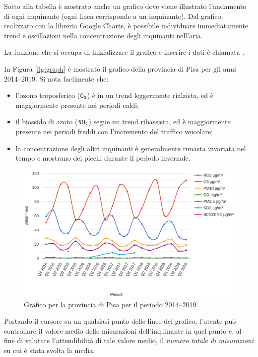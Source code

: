 Sotto alla tabella è mostrato anche un grafico dove viene illustrato l'andamento
di ogni inquinante (ogni linea corrisponde a un inquinante). Dal grafico,
realizzato con la libreria Google Charts, è possibile individuare immediatamente
trend e oscillazioni nella concentrazione degli inquinanti nell'aria.

La funzione che si occupa di inizializzare il grafico e inserire i dati è
chiamata .

In Figura \vref{fig:graph} è mostrato il grafico della provincia di Pisa per gli
anni 2014--2019. Si nota facilmente che:
\begin{itemize}
	\item l'ozono troposferico (\(\mathtt{O_3}\)) è in un trend leggermente
		rialzista, ed è maggiormente presente nei periodi caldi;
	\item il biossido di azoto (\(\mathtt{NO_2}\)) segue un trend ribassista,
		ed è maggiormente presente nei periodi freddi con l'incremento
		del traffico veicolare;
	\item la concentrazione degli altri inquinanti è generalmente rimasta
		invariata nel tempo e mostrano dei picchi durante il periodo
		invernale.
\end{itemize}

\begin{figure}[htp]
	\centering
	\includegraphics[width=\textwidth]{img/graph}
	\caption{Grafico per la provincia di Pisa per il periodo
	2014--2019.}\label{fig:graph}
\end{figure}

Portando il cursore su un qualsiasi punto delle linee del grafico, l'utente può
controllare il valore medio delle misurazioni dell'inquinante in quel punto e,
al fine di valutare l'attendibilità di tale valore medio, il \emph{numero totale
di misurazioni} su cui è stata svolta la media.
